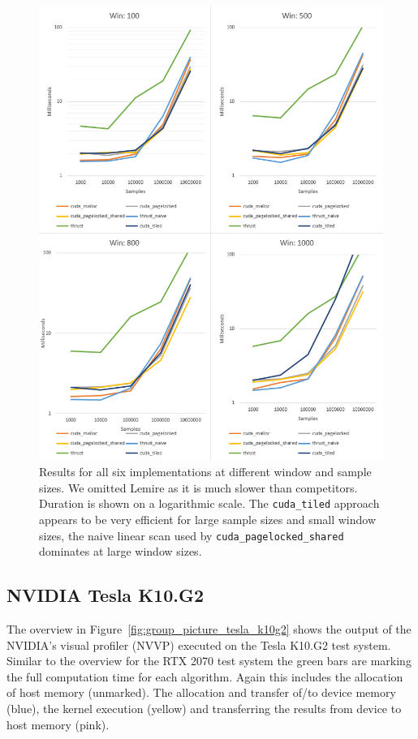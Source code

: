 \begin{figure}[p]
    \centering
    \includegraphics[width=1.0\linewidth]{Figures/rtx2070_ms_vs_samples.png}
    \caption{Results for all six implementations at different window and sample sizes. We omitted Lemire as it is much slower than competitors. Duration is shown on a logarithmic scale. The \texttt{cuda\_tiled} approach appears to be very efficient for large sample sizes and small window sizes, the naive linear scan used by \texttt{cuda\_pagelocked\_shared} dominates at large window sizes.}
    \label{fig:rtx2070_ms_vs_samples}
\end{figure}

\subsection{NVIDIA Tesla K10.G2}

The overview in Figure~\ref{fig:group_picture_tesla_k10g2} shows the output of the NVIDIA's visual profiler (NVVP) executed on the Tesla K10.G2 test system. Similar to the overview for the RTX 2070 test system the green bars are marking the full computation time for each algorithm. Again this includes the allocation of host memory (unmarked). The allocation and transfer of/to device memory (blue), the kernel execution (yellow) and transferring the results from device to host memory (pink).

